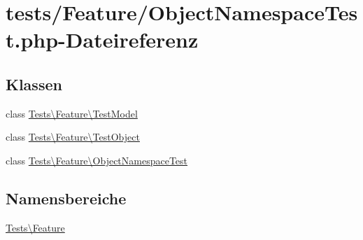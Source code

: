 \hypertarget{ObjectNamespaceTest_8php}{}\section{tests/\+Feature/\+Object\+Namespace\+Test.php-\/\+Dateireferenz}
\label{ObjectNamespaceTest_8php}
\subsection*{Klassen}
\begin{DoxyCompactItemize}
\item 
class \hyperlink{classTests_1_1Feature_1_1TestModel}{Tests\textbackslash{}\+Feature\textbackslash{}\+Test\+Model}
\item 
class \hyperlink{classTests_1_1Feature_1_1TestObject}{Tests\textbackslash{}\+Feature\textbackslash{}\+Test\+Object}
\item 
class \hyperlink{classTests_1_1Feature_1_1ObjectNamespaceTest}{Tests\textbackslash{}\+Feature\textbackslash{}\+Object\+Namespace\+Test}
\end{DoxyCompactItemize}
\subsection*{Namensbereiche}
\begin{DoxyCompactItemize}
\item 
 \hyperlink{namespaceTests_1_1Feature}{Tests\textbackslash{}\+Feature}
\end{DoxyCompactItemize}
